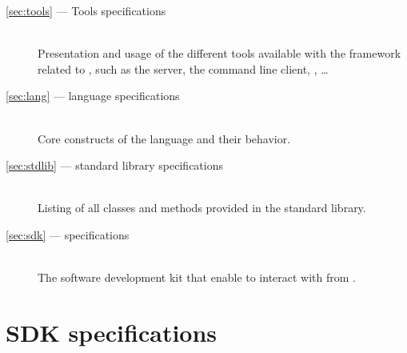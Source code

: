 \documentclass[openright,twoside,12pt]{report}
\begin{document}
\begin{description}
  \newcommand{\xitem}[2]{\item[\autoref{#1} --- #2]~\\}
\xitem{sec:tools}{Tools specifications}%
  Presentation and usage of the different tools available with the
  \urbi framework related to \us, such as the \urbi server, the
  command line client, \umake, \ldots

\xitem{sec:lang}{\us language specifications}%
  Core constructs of the language and their behavior.

\xitem{sec:stdlib}{\us standard library specifications}%
  Listing of all classes and methods provided in the standard library.

\xitem{sec:sdk}{\urbi \sdk specifications}%
  The \urbi software development kit that enable to
  interact with \urbi from \Cxx.
\end{description}


\FloatBarrier

\FloatBarrier

\FloatBarrier

\chapter{\urbi SDK specifications}
\label{sec:sdk}

\end{document}

